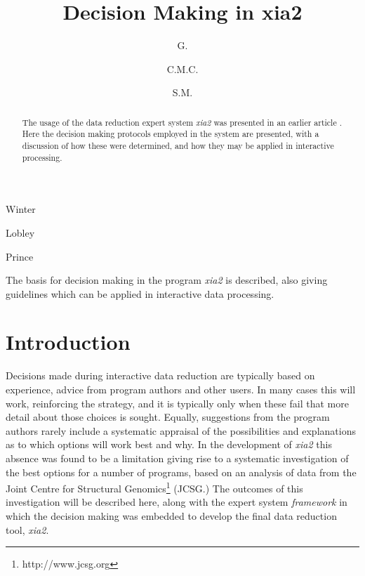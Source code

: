 \documentclass[preprint,pdf]{iucr}
\begin{document}
\title{Decision Making in xia2}

\author[a]{G.}{Winter}
\author[a]{C.M.C.}{Lobley}
\author[b]{S.M.}{Prince}


\maketitle
\clearpage

\begin{synopsis}
The basis for decision making in the program \emph{xia2} is described,
also giving guidelines which can be applied in interactive data processing.
\end{synopsis}

\begin{abstract}

The usage of the data reduction expert system \emph{xia2} was
presented in an earlier article \cite{Winter:ea5113}. Here the decision making
protocols employed in the system are presented, with a discussion
of how these were determined, and how they may be applied in interactive
processing. 

\end{abstract}

\section{Introduction}

Decisions made during interactive data reduction are typically based
on experience, advice from program authors and other users. In many
cases this will work, reinforcing the strategy, and it is typically
only when these fail that more detail about those choices is
sought. Equally, suggestions from the program authors rarely include a
systematic appraisal of the possibilities and explanations as to
which options will work best and why. 
In the development of \emph{xia2} this absence was found
to be a limitation giving rise to a systematic investigation of the best
options for a number of programs, 
based on an analysis of data from the Joint Centre
for Structural Genomics\footnote{http://www.jcsg.org} (JCSG.) The
outcomes of this investigation will be described here, along with the
expert system \emph{framework} in which the decision making was
embedded to develop the final data reduction tool, \emph{xia2}.
\end{document}
